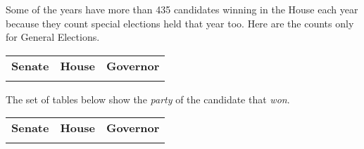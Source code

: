 \documentclass[12pt]{article}
\begin{document}
\begin{itemize}[leftmargin=*]
Some of the years have more than 435 candidates winning in the House each year because they count special elections held that year too. Here are the counts only for General Elections.

\begin{tabularx}{\linewidth}{CCC}
    \textbf{Senate} & \textbf{House} & \textbf{Governor}\\
     &  & 
    \end{tabularx}


The set of tables below show the \emph{party} of the candidate that \emph{won}. 

    \begin{tabularx}{\linewidth}{CCC}
    \textbf{Senate} & \textbf{House} & \textbf{Governor}\\
     &  & 
    \end{tabularx}

\end{itemize}
	
\end{document}
